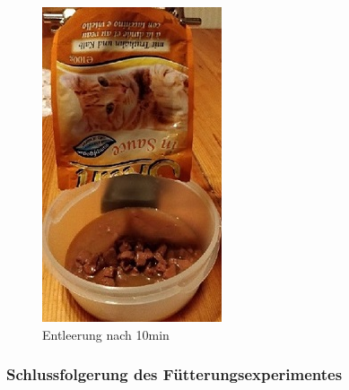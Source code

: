 \begin{figure}[H]
\begin{minipage}[hbt]{.33 \linewidth}
     \includegraphics[width=\linewidth]{Bilder/Fuetterungsexperiment/Fuetterungs_Ende}  
      \caption{Entleerung nach 10min}
     \label{Fütterungs_Ende}
   \end{minipage}
\end{figure}

\subsubsection{Schlussfolgerung des Fütterungsexperimentes}

